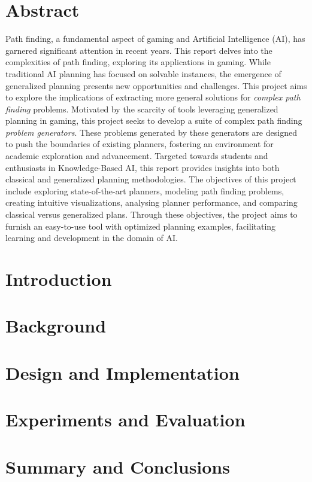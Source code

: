 \documentclass[12pt,a4paper]{report}
\begin{document}
\chapter*{Abstract}
Path finding, a fundamental aspect of gaming and Artificial Intelligence (AI), has garnered significant attention in recent years. This report delves into the complexities of path finding, exploring its applications in gaming. While traditional AI planning has focused on solvable instances, the emergence of generalized planning presents new opportunities and challenges. This project aims to explore the implications of extracting more general solutions for \textit{complex path finding} problems. Motivated by the scarcity of tools leveraging generalized planning in gaming, this project seeks to develop a suite of complex path finding \textit{problem generators}. These problems generated by these generators are designed to push the boundaries of existing planners, fostering an environment for academic exploration and advancement. Targeted towards students and enthusiasts in Knowledge-Based AI, this report provides insights into both classical and generalized planning methodologies. The objectives of this project include exploring state-of-the-art planners, modeling path finding problems, creating intuitive visualizations, analysing planner performance, and comparing classical versus generalized plans. Through these objectives, the project aims to furnish an easy-to-use tool with optimized planning examples, facilitating learning and development in the domain of AI.

\chapter{Introduction}


\chapter{Background}


\chapter{Design and Implementation}


\chapter{Experiments and Evaluation}


\chapter{Summary and Conclusions}





\appendix

\end{document}
